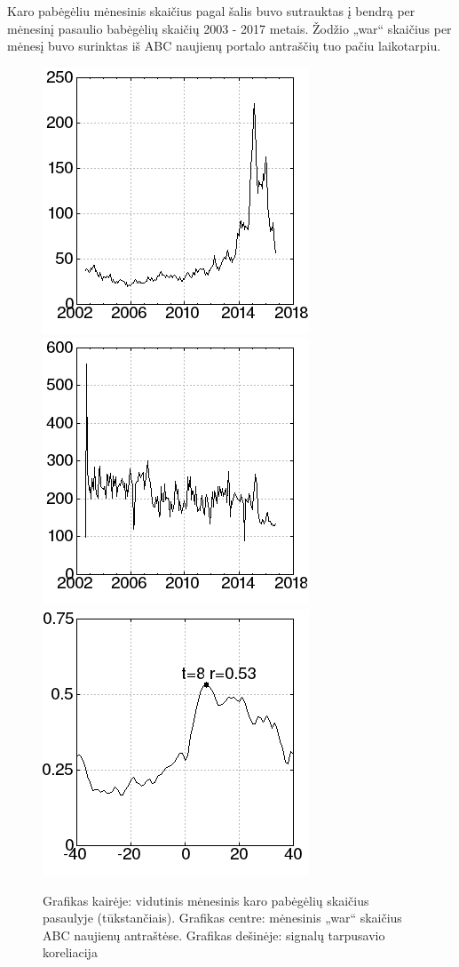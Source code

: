 Karo pabėgėliu mėnesinis skaičius pagal šalis\cite{refugees} buvo sutrauktas į bendrą per mėnesinį pasaulio babėgėlių skaičių 2003 - 2017 metais.
Žodžio „war“ skaičius per mėnesį buvo surinktas iš ABC naujienų portalo antraščių\cite{abcNews} tuo pačiu laikotarpiu.

\begin{figure}
\includegraphics[scale=0.65]{../scripts/refugees_war/refugees.png}
\includegraphics[scale=0.65]{../scripts/refugees_war/war.png}
\includegraphics[scale=0.65]{../scripts/refugees_war/result.png}
    \caption{Grafikas kairėje: vidutinis mėnesinis karo pabėgėlių skaičius pasaulyje (tūkstančiais). Grafikas centre: mėnesinis „war“ skaičius ABC naujienų antraštėse. Grafikas dešinėje: signalų tarpusavio koreliacija}
\end{figure}

